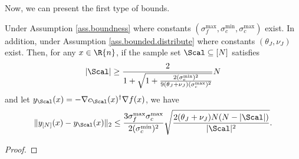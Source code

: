 Now, we can present the first type of bounds.
\begin{lemma}
\label{lemma.bound.y.y_p}
Under Assumption \ref{ass.boundness} where constants $(\sigma_{f}^{\max}, \sigma_c^{\min},\sigma_{c}^{\max})$ exist. In addition, under Assumption \ref{ass.bounded.distribute} where constants $(\theta_J,\nu_J)$ exist. Then, for any $x\in\R{n}$, if the sample set $\Scal\subseteq[N]$ satisfies 
\[
|\Scal|\ge\frac{2}{1+\sqrt{1+\frac{2(\sigma_c^{\min})^2}{9(\theta_J+\nu_J)(\sigma_c^{\max})^2}}}N 
\]
and let $y_\Scal(x)=-\nabla c_\Scal(x)^\dag\nabla f(x)$, we have
 	\[
 	\|y_{[N]}(x)-y_\Scal(x)\|_2\le \frac{3\sigma_f^{\max}\sigma_c^{\max}}{2 (\sigma_c^{\min})^2}\sqrt{ \frac{2(\theta_J+\nu_J)N(N-|\Scal|)}{|\Scal|^2}}.
 	\]
 \end{lemma}
 
\begin{proof}

	

\end{proof}
